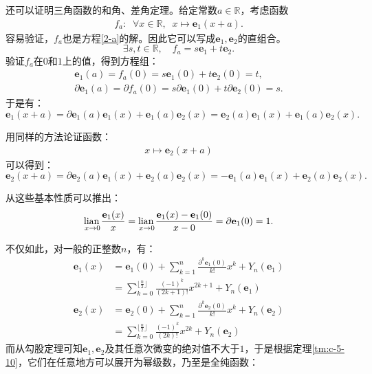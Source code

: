 \documentclass[12pt,UTF8]{ctexbook}
\begin{document}
\begin{appendix}
还可以证明三角函数的和角、差角定理。给定常数$a\in\mathbb{R}$，考虑函数
\begin{align*}
    f_a: \;\; \forall x\in \mathbb{R}, \;\; x\mapsto \mathbf{e}_1(x + a).
\end{align*}
容易验证，$f_a$也是方程\eqref{2-a}的解。因此它可以写成$\mathbf{e}_1, \mathbf{e}_2$的直组合。
$$ \exists s, t \in \mathbb{R}, \quad f_a = s\mathbf{e}_1 + t\mathbf{e}_2. $$
验证$f_a$在$0$和$1$上的值，得到方程组：
$$
\begin{array}{ll}
    \mathbf{e}_1(a) = f_a(0) = s\mathbf{e}_1(0) + t \mathbf{e}_2(0) = t,\\
    \partial \mathbf{e}_1(a) = \partial f_a(0) = s\partial \mathbf{e}_1(0) + t \partial \mathbf{e}_2(0) = s.
\end{array}
$$
于是有：
$$ \mathbf{e}_1(x + a) = \partial \mathbf{e}_1(a)\mathbf{e}_1(x) + \mathbf{e}_1(a)\mathbf{e}_2(x) =  \mathbf{e}_2(a)\mathbf{e}_1(x) + \mathbf{e}_1(a)\mathbf{e}_2(x). $$

用同样的方法论证函数：
\begin{align*}
    x\mapsto \mathbf{e}_2(x + a)
\end{align*}
可以得到：
$$ \mathbf{e}_2(x + a) = \partial \mathbf{e}_2(a)\mathbf{e}_1(x) + \mathbf{e}_2(a)\mathbf{e}_2(x) = -\mathbf{e}_1(a)\mathbf{e}_1(x) + \mathbf{e}_2(a)\mathbf{e}_2(x). $$

从这些基本性质可以推出：
\begin{align*}
    \underset{x\to 0}{\operatorname{lian}\,} \frac{\mathbf{e}_1(x)}{x} = \underset{x\to 0}{\operatorname{lian}\,} \frac{\mathbf{e}_1(x) - \mathbf{e}_1(0)}{x - 0} = \partial \mathbf{e}_1(0) = 1.
\end{align*}

不仅如此，对一般的正整数$n$，有：
\begin{align*}
    \mathbf{e}_1(x) &= \mathbf{e}_1(0) + \sum_{k=1}^n \frac{\partial^k \mathbf{e}_1 (0)}{k!}x^k + Y_n(\mathbf{e}_1) \\
    &= \sum_{k=0}^{\lfloor\frac{n}{2}\rfloor} \frac{(-1)^{k}}{(2k+1)!}x^{2k+1}  + Y_n(\mathbf{e}_1) \\
    \mathbf{e}_2(x) &= \mathbf{e}_2(0) + \sum_{k=1}^n \frac{\partial^k \mathbf{e}_2 (0)}{k!}x^k  + Y_n(\mathbf{e}_2) \\
    &= \sum_{k=0}^{\lfloor\frac{n}{2}\rfloor} \frac{(-1)^{k}}{(2k)!}x^{2k} + Y_n(\mathbf{e}_2) 
\end{align*}
而从勾股定理可知$\mathbf{e}_1, \mathbf{e}_2$及其任意次微变的绝对值不大于$1$，于是根据定理\ref{tm:c-5-10}，它们在任意地方可以展开为幂级数，乃至是全纯函数：


\end{appendix}
\end{document}
